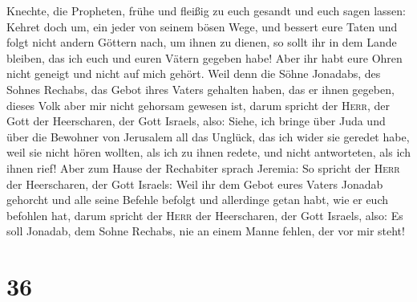 Knechte, die Propheten, frühe und fleißig zu euch gesandt und euch sagen
lassen: Kehret doch um, ein jeder von seinem bösen Wege, und bessert
eure Taten und folgt nicht andern Göttern nach, um ihnen zu dienen, so
sollt ihr in dem Lande bleiben, das ich euch und euren Vätern gegeben
habe! Aber ihr habt eure Ohren nicht geneigt und nicht auf mich gehört.
 Weil denn die Söhne Jonadabs, des Sohnes Rechabs, das
Gebot ihres Vaters gehalten haben, das er ihnen gegeben, dieses Volk
aber mir nicht gehorsam gewesen ist,  darum spricht der
\textsc{Herr}, der Gott der Heerscharen, der Gott Israels, also: Siehe,
ich bringe über Juda und über die Bewohner von Jerusalem all das
Unglück, das ich wider sie geredet habe, weil sie nicht hören wollten,
als ich zu ihnen redete, und nicht antworteten, als ich ihnen rief!
 Aber zum Hause der Rechabiter sprach Jeremia: So spricht
der \textsc{Herr} der Heerscharen, der Gott Israels: Weil ihr dem Gebot
eures Vaters Jonadab gehorcht und alle seine Befehle befolgt und
allerdinge getan habt, wie er euch befohlen hat,  darum
spricht der \textsc{Herr} der Heerscharen, der Gott Israels, also: Es
soll Jonadab, dem Sohne Rechabs, nie an einem Manne fehlen, der vor mir
steht!

\hypertarget{section-35}{%
\section{36}\label{section-35}}

